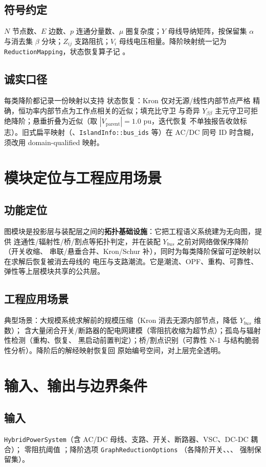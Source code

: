 \documentclass[UTF8,fontset=fandol,a4paper,11pt]{ctexart}
\begin{document}
\subsection{符号约定}
$N$ 节点数、$E$ 边数、$p$ 连通分量数、$\mu$ 圈复杂度；$Y$ 母线导纳矩阵，按保留集 $\alpha$
与消去集 $\beta$ 分块；$Z_{ij}$ 支路阻抗；$V_i$ 母线电压相量。降阶映射统一记为
\texttt{ReductionMapping}，状态恢复算子记 。

\subsection{诚实口径}
每类降阶都记录一份映射以支持  状态恢复：Kron 仅对无源/线性内部节点严格
精确，恒功率内部节点为工作点相关的近似；填充比守卫  与奇异
$Y_{\beta\beta}$ 主元守卫可拒绝降阶；悬垂折叠为近似（取 $|V_{\text{parent}}|=1.0$ pu，迭代恢复
不单独报告收敛标志）。旧式扁平映射（、\texttt{IslandInfo::bus\_ids}
等）在 AC/DC 同号 ID 时含糊，须改用 domain-qualified 映射。

\section{模块定位与工程应用场景}
\subsection{功能定位}
图模块是投影层与装配层之间的\textbf{拓扑基础设施}：它把工程语义系统建为无向图，提供
连通性/辐射性/桥/割点等拓扑判定，并在装配 $Y_{bus}$ 之前对网络做保序降阶（开关收缩、
串联/悬垂合并、Kron/Schur 补），同时为每类降阶保留可逆映射以在求解后恢复被消去母线的
电压与支路潮流。它是潮流、OPF、重构、可靠性、弹性等上层模块共享的公共层。

\subsection{工程应用场景}
典型场景：大规模系统求解前的规模压缩（Kron 消去无源内部节点，降低 $Y_{bus}$ 维数）；
含大量闭合开关/断路器的配电网建模（零阻抗收缩为超节点）；孤岛与辐射性检测（重构、恢复、
黑启动前置判定）；桥/割点识别（可靠性 N-1 与结构脆弱性分析）。降阶后的解经映射恢复回
原始编号空间，对上层完全透明。

\section{输入、输出与边界条件}
\subsection{输入}
\texttt{HybridPowerSystem}（含 AC/DC 母线、支路、开关、断路器、VSC、DC-DC 耦合）；
零阻抗阈值 ；降阶选项 \texttt{GraphReductionOptions}
（各降阶开关、、、 强制保留集）。
\end{document}
